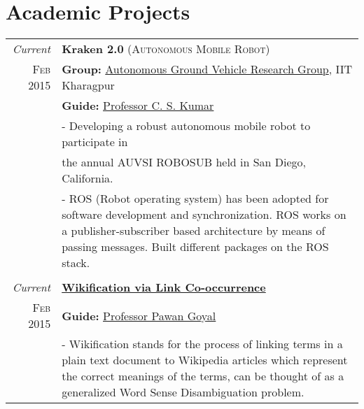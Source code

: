 \documentclass[a4paper,10pt]{article} %
\begin{document}

\section{Academic Projects}

\begin{tabular}{r|p{11cm}}
\emph{Current} & \textbf{Kraken 2.0} \textsc{(Autonomous Mobile Robot)} \\
\textsc{Feb 2015} & \textbf{Group: }\textmd{\href{http://auv-iitkgp.in/}{Autonomous Ground Vehicle Research Group}}, IIT Kharagpur\\
& \textbf{Guide: }\textmd{\href{http://iitkgp.ac.in/fac-profiles/showprofile.php?empcode=aWmdU}{Professor C. S. Kumar}}\\
& \footnotesize{- Developing a robust autonomous mobile robot to participate in}\\
& \footnotesize{ the annual AUVSI ROBOSUB held in San Diego, California.}\\
& \footnotesize{- ROS (Robot operating system) has been adopted for software development and synchronization. ROS works on a publisher-subscriber based architecture by means of passing messages. Built different packages on the ROS stack.}\\
\multicolumn{2}{c}{} \\


\emph{Current} & \textbf{\href{http://www.cs.sjtu.edu.cn/~kzhu/papers/wikification.pdf}{Wikiﬁcation via Link Co-occurrence}} \\
\textsc{Feb 2015} & \textbf{Guide: }\textmd{\href{http://cse.iitkgp.ac.in/~pawang/}{Professor Pawan Goyal}}\\
& \footnotesize{- Wikiﬁcation stands for the process of linking terms in a plain text document to Wikipedia articles which represent the correct meanings of the terms, can be thought of as a generalized Word Sense Disambiguation problem.}\\
\end{tabular}

\end{document}
